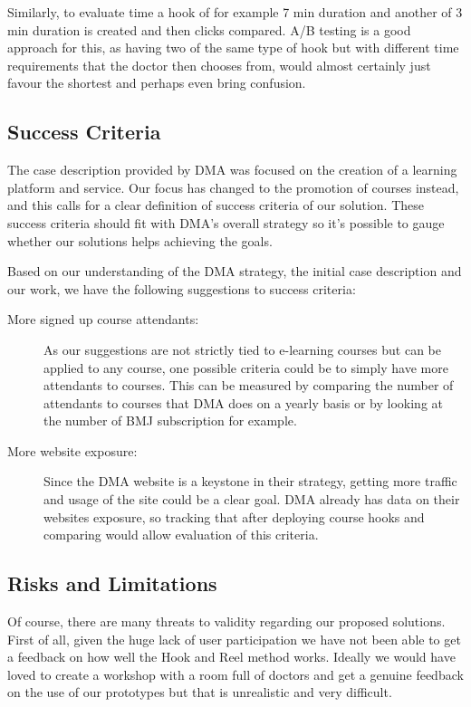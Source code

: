 Similarly, to evaluate time a hook of for example 7 min duration and another of 3 min duration is created and then clicks compared. A/B testing is a good approach for this, as having two of the same type of hook but with different time requirements that the doctor then chooses from, would almost certainly just favour the shortest and perhaps even bring confusion. 

\subsection{Success Criteria}
The case description provided by DMA was focused on the creation of a learning platform and service. Our focus has changed to the promotion of courses instead, and this calls for a clear definition of success criteria of our solution. These success criteria should fit with DMA’s overall strategy so it’s possible to gauge whether our solutions helps achieving the goals. 

Based on our understanding of the DMA strategy, the initial case description and our work, we have the following suggestions to success criteria:
\begin{description}
\item[More signed up course attendants:] As our suggestions are not strictly tied to e-learning courses but can be applied to any course, one possible criteria could be to simply have more attendants to courses. This can be measured by comparing the number of attendants to courses that DMA does on a yearly basis or by looking at the number of BMJ subscription for example. 

\item[More website exposure:] Since the DMA website is a keystone in their strategy, getting more traffic and usage of the site could be a clear goal. DMA already has data on their websites exposure, so tracking that after deploying course hooks and comparing would allow evaluation of this criteria. 
\end{description}

\subsection{Risks and Limitations}
Of course, there are many threats to validity regarding our proposed solutions. First of all, given the huge lack of user participation we have not been able to get a feedback on how well the Hook and Reel method works. Ideally we would have loved to create a workshop with a room full of doctors and get a genuine feedback on the use of our prototypes but that is unrealistic and very difficult. 

